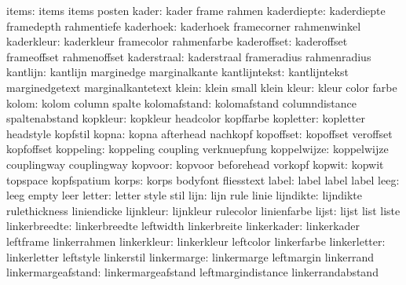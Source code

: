                items:  items                items                posten
               kader:  kader                frame                rahmen
         kaderdiepte:  kaderdiepte          framedepth           rahmentiefe
           kaderhoek:  kaderhoek            framecorner          rahmenwinkel
          kaderkleur:  kaderkleur           framecolor           rahmenfarbe
         kaderoffset:  kaderoffset          frameoffset          rahmenoffset
         kaderstraal:  kaderstraal          frameradius          rahmenradius
            kantlijn:  kantlijn             marginedge           marginalkante
       kantlijntekst:  kantlijntekst        marginedgetext       marginalkantetext
               klein:  klein                small                klein
               kleur:  kleur                color                farbe
               kolom:  kolom                column               spalte
        kolomafstand:  kolomafstand         columndistance       spaltenabstand
            kopkleur:  kopkleur             headcolor            kopffarbe
           kopletter:  kopletter            headstyle            kopfstil
               kopna:  kopna                afterhead            nachkopf
           kopoffset:  kopoffset            veroffset            kopfoffset
           koppeling:  koppeling            coupling             verknuepfung
         koppelwijze:  koppelwijze          couplingway          couplingway  %
             kopvoor:  kopvoor              beforehead           vorkopf
              kopwit:  kopwit               topspace             kopfspatium
               korps:  korps                bodyfont             fliesstext
               label:  label                label                label
                leeg:  leeg                 empty                leer
              letter:  letter               style                stil
                lijn:  lijn                 rule                 linie
           lijndikte:  lijndikte            rulethickness        liniendicke
           lijnkleur:  lijnkleur            rulecolor            linienfarbe
               lijst:  lijst                list                 liste
       linkerbreedte:  linkerbreedte        leftwidth            linkerbreite
         linkerkader:  linkerkader          leftframe            linkerrahmen
         linkerkleur:  linkerkleur          leftcolor            linkerfarbe
        linkerletter:  linkerletter         leftstyle            linkerstil
         linkermarge:  linkermarge          leftmargin           linkerrand
  linkermargeafstand:  linkermargeafstand   leftmargindistance   linkerrandabstand
